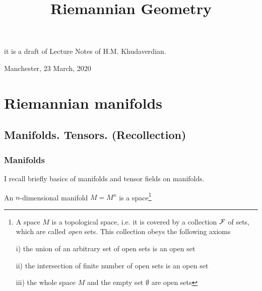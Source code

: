 \documentclass[12pt]{article}
\title{Riemannian Geometry}
\date{}
\theoremstyle{theorem}
\numberwithin{equation}{section}
\begin{document}
\maketitle

  \centerline {it is a draft of Lecture Notes of H.M. Khudaverdian.}

  \centerline { Manchester,  23 March,  2020}





\tableofcontents
{}
\newpage
{}




\section {Riemannian manifolds}


\subsection { Manifolds. Tensors. (Recollection)}

\subsubsection{Manifolds}



I recall briefly basics of manifolds 
and tensor fields on manifolds.

An $n$-dimensional manifold $M=M^n$ is a 
space\footnote
{A space $M$ is a topological space, i.e. it 
is covered by a collection $\cal F$ of sets,
which are called {\it open} sets.  This collection
obeys the following axioms

i) the union of an arbitrary set of open sets
is an open set

ii) the intersection of finite number of open sets
is an open set

iii) the whole space $M$ and the empty set 
$\emptyset$ are open sets
} 
\end{document}
